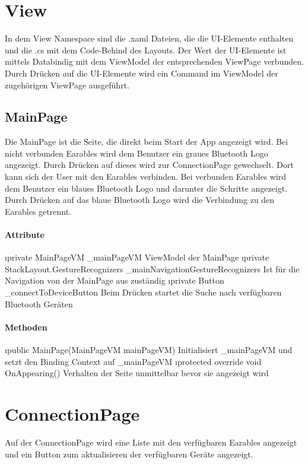 \documentclass[../entwurf.tex]{subfiles}
\begin{document}
\section{View}
In dem View Namespace sind die .xaml Dateien, die die UI-Elemente enthalten und die .cs mit dem Code-Behind des Layouts. Der Wert der UI-Elemente ist mittels Databindig mit dem ViewModel der entsprechenden ViewPage verbunden. Durch Drücken auf die UI-Elemente wird ein Command im ViewModel der zugehörigen ViewPage ausgeführt. 
\subsection{MainPage}
Die MainPage ist die Seite, die direkt beim Start der App angezeigt wird. Bei nicht verbunden Earables wird dem Benutzer ein graues Bluetooth Logo angezeigt. Durch Drücken auf dieses wird zur ConnectionPage gewechselt. Dort kann sich der User mit den Earables verbinden. Bei verbunden Earables wird dem Benutzer ein blaues Bluetooth Logo und darunter die Schritte angezeigt. Durch Drücken auf das blaue Bluetooth Logo wird die Verbindung zu den Earables getrennt. 
\paragraph{Attribute}

\begin{itemize}
	\i{private MainPageVM \_mainPageVM} ViewModel der MainPage
	\i{private StackLayout.GestureRecognizers \_mainNavigationGestureRecognizers} Ist für die Navigation von der MainPage aus zuständig
	\i{private Button \_connectToDeviceButton} Beim Drücken startet die Suche nach verfügbaren Bluetooth Geräten
\end{itemize}
\paragraph{Methoden}
\begin{itemize}
	\i{public MainPage(MainPageVM mainPageVM)} Initialisiert \_mainPageVM und setzt den Binding Context 			auf \_mainPageVM
	\i{protected override void OnAppearing()} Verhalten der Seite unmittelbar bevor sie angezeigt wird
\end{itemize}

\section{ConnectionPage}
Auf der ConnectionPage wird eine Liste mit den verfügbaren Earables angezeigt und ein Button zum aktualisieren der verfügbaren Geräte angezeigt. 
\end{document}
